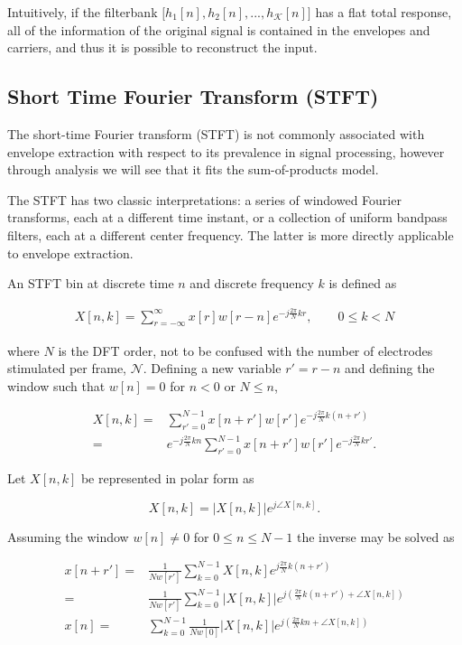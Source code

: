 \documentclass [11pt, proquest,oneside] {ganter_thesis}[2015/03/03]
\begin{document}
Intuitively, if the filterbank $\Big[h_1[n], h_2[n], ...,h_\mathcal{K}[n]\Big]$ has a flat total response, all of the information of the original signal is contained in the envelopes and carriers, and thus it is possible to reconstruct the input.

\subsection{Short Time Fourier Transform (STFT)}

The short-time Fourier transform (STFT) is not commonly associated with envelope extraction with respect to its prevalence in signal processing, however through analysis we will see that it fits the sum-of-products model.

The STFT has two classic interpretations: a series of windowed Fourier transforms, each at a different time instant, or a collection of uniform bandpass filters, each at a different center frequency.  The latter is more directly applicable to envelope extraction.

An STFT bin at discrete time $n$ and discrete frequency $k$ is defined as

\begin{align}
\label{eq:STFTdefinition}
X[n,k] = \sum\limits_{r=-\infty}^{\infty} x[r] w[r - n] e^{-j\frac{2\pi}{N}kr}, \qquad 0 \leq k < N
\end{align}

where $N$ is the DFT order, not to be confused with the number of electrodes stimulated per frame, $\mathcal{N}$.  Defining a new variable $r' = r - n$ and defining the window such that  $w[n] = 0$ for $n < 0$ or $N \leq n$,

\begin{align}
X[n,k] =& \sum\limits_{r'=0}^{N-1} x[n + r'] w[r'] e^{-j\frac{2\pi}{N}k(n + r')} \nonumber \\
=& e^{-j\frac{2\pi}{N}kn} \sum\limits_{r'=0}^{N-1} x[n + r'] w[r'] e^{-j\frac{2\pi}{N}kr'}.
\end{align}

Let $X[n,k]$ be represented in polar form as

\begin{equation}
X[n,k] = \vert X[n,k]\vert e^{j\angle X[n,k]}.
\end{equation}

Assuming the window $w[n] \neq 0$ for $0 \leq n \leq N-1$ the inverse may be solved as

\begin{align}
\label{eq:hop_factor}
x[n + r'] =& \frac{1}{Nw[r']}  \sum\limits_{k=0}^{N-1} X[n,k] e^{j\frac{2\pi}{N}k(n+r')} \nonumber \\
=& \frac{1}{Nw[r']}  \sum\limits_{k=0}^{N-1} \vert X[n,k]\vert e^{j(\frac{2\pi}{N}k(n+r') + \angle X[n,k])} \\
\label{eq:hop_factor_1}
x[n] =&\sum\limits_{k=0}^{N-1}  \frac{1}{Nw[0]}  \vert X[n,k]\vert e^{j(\frac{2\pi}{N}kn + \angle X[n,k])}
\end{align}
\end{document}
